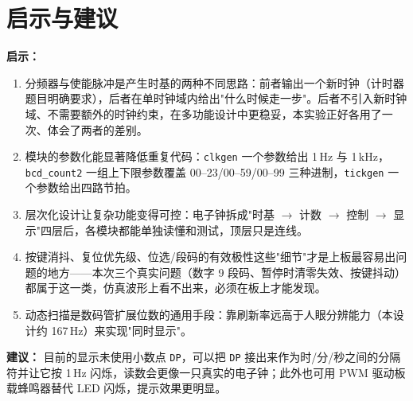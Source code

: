 \documentclass[12pt, a4paper]{ctexart}
\begin{document}
\section{启示与建议}

\textbf{启示：}
\begin{enumerate}
    \item 分频器与使能脉冲是产生时基的两种不同思路：前者输出一个新时钟（计时器题目明确要求），后者在单时钟域内给出"什么时候走一步"。后者不引入新时钟域、不需要额外的时钟约束，在多功能设计中更稳妥，本实验正好各用了一次、体会了两者的差别。
    \item 模块的参数化能显著降低重复代码：\texttt{clkgen} 一个参数给出 1\,Hz 与 1\,kHz，\texttt{bcd\_count2} 一组上下限参数覆盖 00--23/00--59/00--99 三种进制，\texttt{tickgen} 一个参数给出四路节拍。
    \item 层次化设计让复杂功能变得可控：电子钟拆成"时基 $\to$ 计数 $\to$ 控制 $\to$ 显示"四层后，各模块都能单独读懂和测试，顶层只是连线。
    \item 按键消抖、复位优先级、位选/段码的有效极性这些"细节"才是上板最容易出问题的地方——本次三个真实问题（数字 9 段码、暂停时清零失效、按键抖动）都属于这一类，仿真波形上看不出来，必须在板上才能发现。
    \item 动态扫描是数码管扩展位数的通用手段：靠刷新率远高于人眼分辨能力（本设计约 167\,Hz）来实现"同时显示"。
\end{enumerate}

\textbf{建议：} 目前的显示未使用小数点 \texttt{DP}，可以把 \texttt{DP} 接出来作为时/分/秒之间的分隔符并让它按 1\,Hz 闪烁，读数会更像一只真实的电子钟；此外也可用 PWM 驱动板载蜂鸣器替代 LED 闪烁，提示效果更明显。
\end{document}
